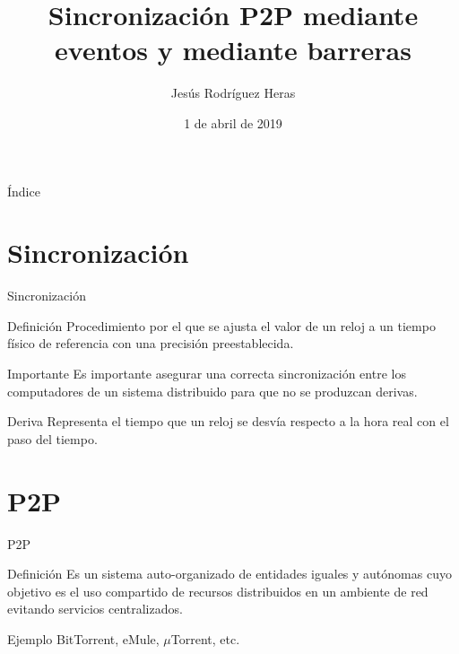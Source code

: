 \documentclass{beamer}
\title{Sincronización P2P mediante eventos y mediante barreras}
\author{Jesús Rodríguez Heras}
\date{1 de abril de 2019}
\begin{document}
\begin{frame}
  \titlepage
\end{frame}

\begin{frame}{Índice}
  \tableofcontents
\end{frame}


\section{Sincronización}
\begin{frame}{Sincronización}
	\begin{block}{Definición}
		Procedimiento por el que se ajusta el valor de un reloj a un tiempo físico de referencia con una precisión preestablecida.
	\end{block}
	\begin{alertblock}{Importante}
		Es importante asegurar una correcta sincronización entre los computadores de un sistema distribuido para que no se produzcan derivas.
	\end{alertblock}
	\begin{block}{Deriva}
		Representa el tiempo que un reloj se desvía respecto a la hora real con el paso del tiempo.
	\end{block}
\end{frame}

\section{P2P}
\begin{frame}{P2P}
	\begin{block}{Definición}
		Es un sistema auto-organizado de entidades iguales y autónomas cuyo objetivo es el uso compartido de recursos distribuidos en un ambiente de red evitando servicios centralizados.
	\end{block}
	\begin{exampleblock}{Ejemplo}
		BitTorrent, eMule, $\mu$Torrent, etc.
	\end{exampleblock}
\end{frame}
\end{document}
